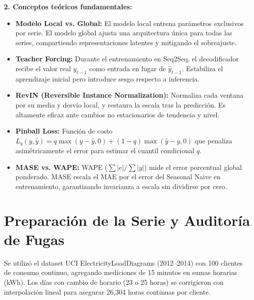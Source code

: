 \documentclass[10pt,letterpaper]{article}
\begin{document}
\textbf{2. Conceptos teóricos fundamentales:}
\begin{itemize}\setlength\itemsep{0.1em}
    \item \textbf{Modelo Local vs. Global:} El modelo local entrena parámetros exclusivos por serie. El modelo global ajusta una arquitectura única para todas las series, compartiendo representaciones latentes y mitigando el sobreajuste.
    \item \textbf{Teacher Forcing:} Durante el entrenamiento en Seq2Seq, el decodificador recibe el valor real $y_{t-1}$ como entrada en lugar de $\hat{y}_{t-1}$. Estabiliza el aprendizaje inicial pero introduce sesgo respecto a inferencia.
    \item \textbf{RevIN (Reversible Instance Normalization):} Normaliza cada ventana por su media y desvío local, y restaura la escala tras la predicción. Es altamente eficaz ante cambios no estacionarios de tendencia y nivel.
    \item \textbf{Pinball Loss:} Función de costo $L_q(y, \hat{y}) = q \max(y - \hat{y}, 0) + (1-q) \max(\hat{y} - y, 0)$ que penaliza asimétricamente el error para estimar el cuantil condicional $q$.
    \item \textbf{MASE vs. WAPE:} WAPE ($\sum |e| / \sum |y|$) mide el error porcentual global ponderado. MASE escala el MAE por el error del Seasonal Naive en entrenamiento, garantizando invarianza a escala sin dividirse por cero.
\end{itemize}

\section{Preparación de la Serie y Auditoría de Fugas}

Se utilizó el dataset UCI ElectricityLoadDiagrams (2012--2014) con 100 clientes de consumo continuo, agregando mediciones de 15 minutos en sumas horarias (kWh). Los días con cambio de horario (23 o 25 horas) se corrigieron con interpolación lineal para asegurar 26,304 horas continuas por cliente.
\end{document}

